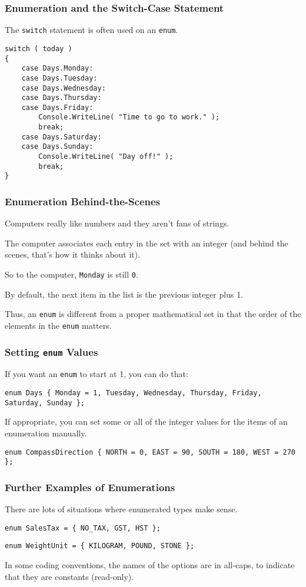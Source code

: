 \begin{frame}[fragile]
\frametitle{Enumeration and the Switch-Case Statement}
The \texttt{switch} statement is often used on an \texttt{enum}.

\begin{verbatim}
switch ( today )
{
    case Days.Monday:
    case Days.Tuesday:
    case Days.Wednesday:
    case Days.Thursday:
    case Days.Friday:
        Console.WriteLine( "Time to go to work." );
        break;
    case Days.Saturday:
    case Days.Sunday:
        Console.WriteLine( "Day off!" );
        break;
}
\end{verbatim}

\end{frame}

\begin{frame}
\frametitle{Enumeration Behind-the-Scenes}
Computers really like numbers and they aren't fans of strings.

The computer associates each entry in the set with an integer (and behind the scenes, that's how it thinks about it).

So to the computer, \texttt{Monday} is still \texttt{0}.

By default, the next item in the list is the previous integer plus 1.

Thus, an \texttt{enum} is different from a proper mathematical set in that the order of the elements in the \texttt{enum} matters.

\end{frame}

\begin{frame}
\frametitle{Setting \texttt{enum} Values}

If you want an \texttt{enum} to start at 1, you can do that:

\texttt{enum Days \{ Monday = 1, Tuesday, Wednesday, Thursday, Friday, Saturday, Sunday \};}

If appropriate, you can set some or all of the integer values for the items of an enumeration manually.

\texttt{enum CompassDirection \{ NORTH = 0, EAST = 90, SOUTH = 180, WEST = 270 \};}

\end{frame}

\begin{frame}
\frametitle{Further Examples of Enumerations}
There are lots of situations where enumerated types make sense.

\texttt{enum SalesTax = \{ NO\_TAX, GST, HST \}; }

\texttt{enum WeightUnit = \{ KILOGRAM, POUND, STONE \};}

In some coding conventions, the names of the options are in all-caps, to indicate that they are constants (read-only).

\end{frame}

